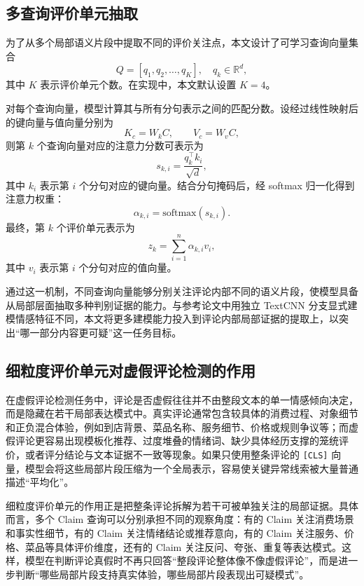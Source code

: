 \documentclass[UTF8,oneside,openright,fontset=none]{ctexbook}
\numberwithin{equation}{chapter}
\begin{document}
\subsection{多查询评价单元抽取}

为了从多个局部语义片段中提取不同的评价关注点，本文设计了可学习查询向量集合
\begin{equation}
  Q=[q_1,q_2,\ldots,q_K], \quad q_k \in \mathbb{R}^{d},
\end{equation}
其中 $K$ 表示评价单元个数。在实现中，本文默认设置 $K=4$。

对每个查询向量，模型计算其与所有分句表示之间的匹配分数。设经过线性映射后的键向量与值向量分别为
\begin{equation}
  K_c = W_k C, \qquad V_c = W_v C,
\end{equation}
则第 $k$ 个查询向量对应的注意力分数可表示为
\begin{equation}
  s_{k,i} = \frac{q_k^\top k_i}{\sqrt{d}},
\end{equation}
其中 $k_i$ 表示第 $i$ 个分句对应的键向量。结合分句掩码后，经 softmax 归一化得到注意力权重：
\begin{equation}
  \alpha_{k,i} = \mathrm{softmax}(s_{k,i}).
\end{equation}
最终，第 $k$ 个评价单元表示为
\begin{equation}
  z_k = \sum_{i=1}^{n} \alpha_{k,i} v_i,
\end{equation}
其中 $v_i$ 表示第 $i$ 个分句对应的值向量。

通过这一机制，不同查询向量能够分别关注评论内部不同的语义片段，使模型具备从局部层面抽取多种判别证据的能力。与参考论文中用独立 TextCNN 分支显式建模情感特征不同，本文将更多建模能力投入到评论内部局部证据的提取上，以突出“哪一部分内容更可疑”这一任务目标。

\subsection{细粒度评价单元对虚假评论检测的作用}

在虚假评论检测任务中，评论是否虚假往往并不由整段文本的单一情感倾向决定，而是隐藏在若干局部表达模式中。真实评论通常包含较具体的消费过程、对象细节和正负混合体验，例如到店背景、菜品名称、服务细节、价格或规则争议等；而虚假评论更容易出现模板化推荐、过度堆叠的情绪词、缺少具体经历支撑的笼统评价，或者评分结论与文本证据不一致等现象。如果只使用整条评论的 \texttt{[CLS]} 向量，模型会将这些局部片段压缩为一个全局表示，容易使关键异常线索被大量普通描述“平均化”。

细粒度评价单元的作用正是把整条评论拆解为若干可被单独关注的局部证据。具体而言，多个 Claim 查询可以分别承担不同的观察角度：有的 Claim 关注消费场景和事实性细节，有的 Claim 关注情绪结论或推荐意向，有的 Claim 关注服务、价格、菜品等具体评价维度，还有的 Claim 关注反问、夸张、重复等表达模式。这样，模型在判断评论真假时不再只回答“整段评论整体像不像虚假评论”，而是进一步判断“哪些局部片段支持真实体验，哪些局部片段表现出可疑模式”。
\end{document}
